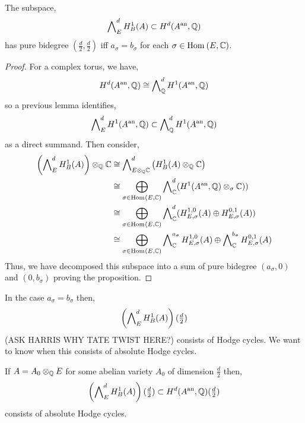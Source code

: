 \documentclass[12pt]{article}
\begin{document}
\begin{proposition}
The subspace,
\[ \bigwedge\nolimits^d_E H^1_B(A) \subset H^d(A^{\mathrm{an}}, \mathbb{Q}) \]
has pure bidegree $(\tfrac{d}{2}, \tfrac{d}{2})$ iff $a_\sigma = b_\sigma$ for each $\sigma \in \mathrm{Hom}_{} \left( E, \mathbb{C} \right)$. 
\end{proposition}

\begin{proof}
For a complex torus, we have,
\[ H^d(A^{\mathrm{an}}, \mathbb{Q}) \cong \bigwedge\nolimits^d_{\mathbb{Q}} H^1(A^{\mathrm{an}}, \mathbb{Q}) \] 
so a previous lemma identifies,
\[ \bigwedge\nolimits^d_{E} H^1(A^{\mathrm{an}}, \mathbb{Q}) \subset \bigwedge\nolimits^d_{\mathbb{Q}} H^1(A^{\mathrm{an}}, \mathbb{Q}) \]
as a direct summand. 
Then consider,
\begin{align*}
\left( \bigwedge\nolimits^d_E H^1_B(A) \right) \otimes_{\mathbb{Q}} \mathbb{C} & \cong \bigwedge\nolimits^d_{E \otimes_{\mathbb{Q}} \mathbb{C}} \left( H^1_B(A) \otimes_{\mathbb{Q}} \mathbb{C} \right) 
\\
& \cong \bigoplus_{\sigma \in \mathrm{Hom}_{} \left( E, \mathbb{C} \right)} \bigwedge\nolimits^d_{\mathbb{C}} (H^1(A^{\mathrm{an}}, \mathbb{Q}) \otimes_{\sigma} \mathbb{C}) )
\\
& \cong \bigoplus_{\sigma \in \mathrm{Hom}_{} \left( E, \mathbb{C} \right)} \bigwedge\nolimits^d_{\mathbb{C}} (H^{1,0}_{E, \sigma}(A) \oplus H^{0,1}_{E, \sigma}(A))
\\
& \cong \bigoplus_{\sigma \in \mathrm{Hom}_{} \left( E, \mathbb{C} \right)} \bigwedge\nolimits^{a_\sigma}_{\mathbb{C}} H^{1,0}_{E, \sigma}(A) \oplus \bigwedge\nolimits^{b_\sigma}_{\mathbb{C}} H^{0,1}_{E, \sigma}(A)
\end{align*}
Thus, we have decomposed this subspace into a sum of pure bidegree $(a_\sigma, 0)$ and $(0, b_\sigma)$ proving the proposition. 
\end{proof}

\begin{remark}
In the case $a_\sigma = b_\sigma$ then,
\[ \left( \bigwedge\nolimits^d_E H^1_B(A) \right) (\tfrac{d}{2}) \]
(ASK HARRIS WHY TATE TWIST HERE?) consists of Hodge cycles. We want to know when this consists of absolute Hodge cycles.
\end{remark}

\begin{lemma}
If $A = A_0 \otimes_{\mathbb{Q}} E$ for some abelian variety $A_0$ of dimension $\tfrac{d}{2}$ then,
\[ \left( \bigwedge\nolimits^d_E H^1_B(A) \right) (\tfrac{d}{2}) \subset H^d(A^{\mathrm{an}}, \mathbb{Q}) (\tfrac{d}{2}) \]
consists of absolute Hodge cycles. 
\end{lemma}
\end{document}
